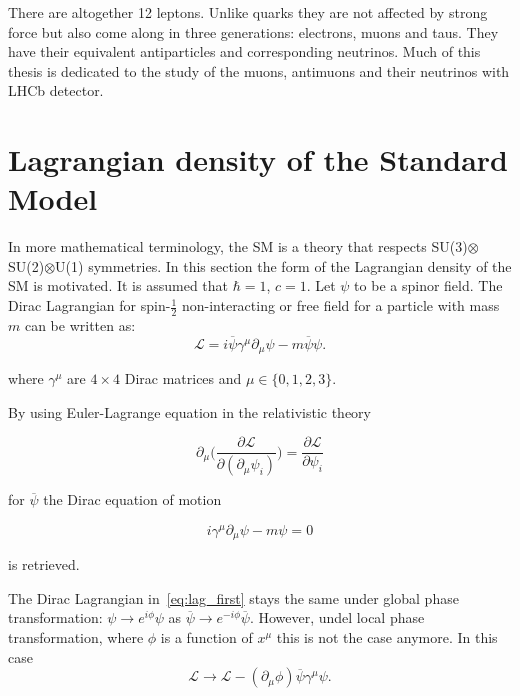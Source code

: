 There are altogether 12 leptons. Unlike quarks they are not affected by strong force but also come along in three generations: electrons, muons and taus. They have their equivalent antiparticles and corresponding neutrinos. Much of this thesis is dedicated to the study of the muons, antimuons and their neutrinos with LHCb detector.

\section{Lagrangian density of the Standard Model}
In more mathematical terminology, the SM is a theory that respects SU(3)$\otimes$SU(2)$\otimes$U(1) symmetries. In this section the form of the Lagrangian density of the SM is motivated. It is assumed that $\hbar=1$, $c=1$. Let $\psi$ to be a spinor field. The Dirac Lagrangian for spin-$\frac{1}{2}$ non-interacting or free field for a particle with mass $m$ can be written as: 
\begin{equation}
\mathcal{L} = i\overline{\psi}\gamma^{\mu}\partial_{\mu}\psi - m\overline{\psi}\psi.
\label{eq:lag_first}
\end{equation}

where $\gamma^{\mu}$ are $4\times 4$ Dirac matrices and $\mu\in\{0,1,2,3\}$.

By using Euler-Lagrange equation in the relativistic theory

\begin{equation}
	\partial_{\mu}\Big(\frac{\partial{\mathcal{L}}}{\partial(\partial_{\mu}\psi_{i})} \Big) =\frac{\partial \mathcal{L}}{\partial\psi_{i}}
\label{eq:lag_first}
\end{equation}

for $\overline\psi$ the Dirac equation of motion

\begin{equation}
 i\gamma^{\mu}\partial_{\mu}\psi - m\psi = 0
\label{eq:lag_first}
\end{equation}

is retrieved.

The Dirac Lagrangian in~\autoref{eq:lag_first} stays the same under global phase transformation: $\psi \rightarrow e^{i\phi}\psi$ as $\overline\psi \rightarrow e^{-i\phi}\overline\psi$. However, undel local phase transformation, where $\phi$ is a function of $x^{\mu}$  this is not the case anymore. In this case
\begin{equation}
\mathcal{L} \rightarrow \mathcal{L}- (\partial_{\mu}\phi) \overline{\psi}\gamma^{\mu}\psi.
\label{eq:notinv}
\end{equation}

